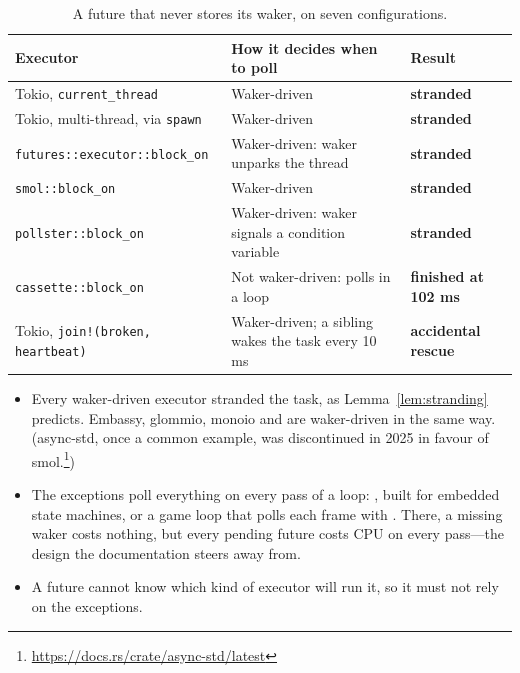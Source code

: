 \begin{table}[htbp]
    \centering\small
    \begin{tabularx}{\linewidth}{>{\raggedright\arraybackslash}p{5cm} Y >{\raggedright\arraybackslash}p{3cm}}
        \toprule
        \textbf{Executor} & \textbf{How it decides when to poll} & \textbf{Result} \\
        \midrule
        Tokio, \texttt{current\_thread} & Waker-driven & \textcolor{red!70!black}{\textbf{stranded}} \\
        Tokio, multi-thread, via \texttt{spawn} & Waker-driven & \textcolor{red!70!black}{\textbf{stranded}} \\
        \texttt{futures::executor::block\_on} & Waker-driven: waker unparks the thread & \textcolor{red!70!black}{\textbf{stranded}} \\
        \texttt{smol::block\_on} & Waker-driven & \textcolor{red!70!black}{\textbf{stranded}} \\
        \texttt{pollster::block\_on} & Waker-driven: waker signals a condition variable & \textcolor{red!70!black}{\textbf{stranded}} \\
        \texttt{cassette::block\_on} & Not waker-driven: polls in a loop & \textcolor{StmtLemma}{\textbf{finished at 102 ms}} \\
        Tokio, \texttt{join!(broken, heartbeat)} & Waker-driven; a sibling wakes the task every 10 ms & \textcolor{StmtProposition}{\textbf{accidental rescue}} \\
        \bottomrule
    \end{tabularx}
    \caption{A future that never stores its waker, on seven configurations.}
    \label{tab:wakers-8.1}
\end{table}

\begin{itemize}
    \item Every waker-driven executor stranded the task, as Lemma~\ref{lem:stranding} predicts. Embassy, glommio, monoio and  are waker-driven in the same way. (async-std, once a common example, was discontinued in 2025 in favour of smol.\footnote{\url{https://docs.rs/crate/async-std/latest}})
    \item The exceptions poll everything on every pass of a loop: , built for embedded state machines, or a game loop that polls each frame with . There, a missing waker costs nothing, but every pending future costs CPU on every pass---the design the  documentation steers away from.
    \item A future cannot know which kind of executor will run it, so it must not rely on the exceptions.
\end{itemize}

